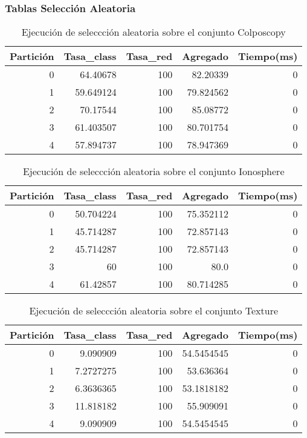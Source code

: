 \documentclass[size=a4, parskip=half, titlepage=false, toc=flat, toc=bib, 12pt]{scrartcl}
\begin{document}
\newpage
\subsubsection{Tablas Selección Aleatoria}

 \begin{table}[ht]
  \centering
  \begin{tabular}[t]{rrrrr}
  \toprule
  Partición &Tasa\_class &Tasa\_red & Agregado & Tiempo(ms)\\
  \midrule
0         & 64.40678  & 100        & 82.20339  & 0      \\
1         & 59.649124 & 100        & 79.824562 & 0      \\
2         & 70.17544  & 100        & 85.08772  & 0      \\
3         & 61.403507 & 100        & 80.701754 & 0      \\
4         & 57.894737 & 100        & 78.947369 & 0      \\
  \bottomrule
  \end{tabular}
  \caption{Ejecución de seleccción aleatoria sobre el conjunto Colposcopy }
  \end{table}%

 \begin{table}[ht]
  \centering
  \begin{tabular}[t]{rrrrr}
  \toprule
  Partición &Tasa\_class &Tasa\_red & Agregado & Tiempo(ms)\\
  \midrule
0         & 50.704224 & 100        & 75.352112 & 0      \\
1         & 45.714287 & 100        & 72.857143 & 0      \\
2         & 45.714287 & 100        & 72.857143 & 0      \\
3         & 60        & 100        & 80.0      & 0      \\
4         & 61.42857  & 100        & 80.714285 & 0      \\
  \bottomrule
  \end{tabular}
  \caption{Ejecución de seleccción aleatoria sobre el conjunto Ionosphere}
  \end{table}%

 \begin{table}[ht]
  \centering
  \begin{tabular}[t]{rrrrr}
  \toprule
  Partición &Tasa\_class &Tasa\_red & Agregado & Tiempo(ms)\\
  \midrule
0         & 9.090909  & 100        & 54.5454545 & 0      \\
1         & 7.2727275 & 100        & 53.636364  & 0      \\
2         & 6.3636365 & 100        & 53.1818182 & 0      \\
3         & 11.818182 & 100        & 55.909091  & 0      \\
4         & 9.090909  & 100        & 54.5454545 & 0      \\
  \bottomrule
  \end{tabular}
  \caption{Ejecución de seleccción aleatoria sobre el conjunto Texture}
  \end{table}%
\end{document}
